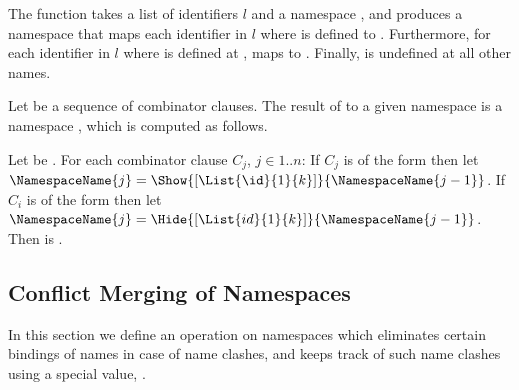 \documentclass[makeidx]{article}
\begin{document}
\LMHash{}%
The function
takes a list of identifiers $l$ and a namespace ,
and produces a namespace  that
maps each identifier \id{} in $l$
where  is defined
to .
Furthermore, for each identifier \id{} in $l$
where  is defined at \code{\id=},
 maps \code{\id=} to .
Finally,  is undefined at all other names.

\LMHash{}%
Let  be a sequence of combinator clauses.
The result of
to a given namespace 
is a namespace ,
which is computed as follows.

\LMHash{}%
Let  be .
For each combinator clause $C_j$, $j \in 1 .. n$:
If $C_j$ is of the form  then let
$\NamespaceName{j} = \Show{[\List{\id}{1}{k}]}{\NamespaceName{j-1}}$.
If $C_i$ is of the form  then let
$\NamespaceName{j} = \Hide{[\List{id}{1}{k}]}{\NamespaceName{j-1}}$.
Then  is .




\subsection{Conflict Merging of Namespaces}

\LMHash{}%
In this section we define an operation on namespaces
which eliminates certain bindings of names in case of name clashes,
and keeps track of such name clashes using a special value,
\Index{\ConflictValue}.
\end{document}
